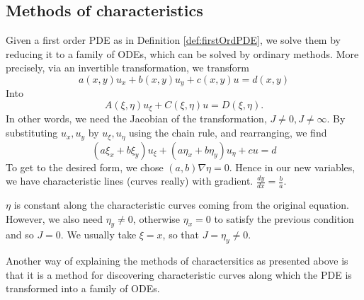 \subsection{Methods of characteristics}
\begin{definition}
  Given a first order PDE as in Definition \ref{def:firstOrdPDE}, we solve them by
  reducing it to a family of ODEs, which can be solved by ordinary methods. More
  precisely, via an invertible transformation, we transform
  \[a(x,y)u_x+b(x,y)u_y+c(x,y)u=d(x,y)\]
  Into 
  \[A(\xi,\eta)u_{\xi}+ C(\xi,\eta)u=D(\xi,\eta).\]
  In other words, we need the Jacobian of the transformation, $J\neq 0, J\neq \infty$. By
  substituting $u_x,u_y$ by $u_{\xi}, u_{\eta}$ using the chain rule, and rearranging, we
  find
  \[(a\xi_x+b\xi_y)u_{\xi} + (a\eta_x +b\eta_y)u_{\eta}+cu=d\]
  To get to the desired form, we chose $(a,b)\nabla\eta =0$. Hence in our new variables,
  we have characteristic lines (curves really) with gradient.
  $\frac{dy}{dx}=\frac{b}{a}$.
  \label{def:methodOfCharaceristics}
\end{definition}
\begin{remark}
  $\eta$ is constant along the characteristic curves coming from the original equation.
  However, we also need $\eta_y\neq 0$, otherwise $\eta_x=0$ to satisfy the previous
  condition and so $J=0$. We usually take $\xi=x$, so that $J=\eta_y\neq 0$.
\end{remark}

Another way of explaining the methods of charactersitics as presented above is that it is
a method for discovering characteristic curves along which the PDE is transformed into a
family of ODEs.


